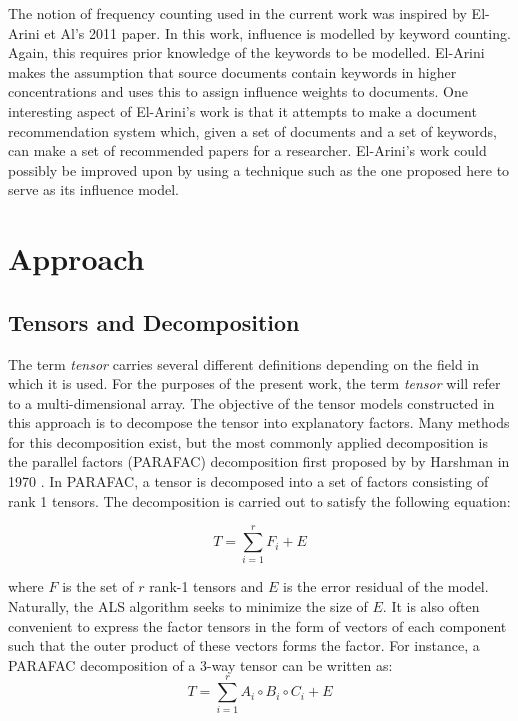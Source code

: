 \documentclass{article}
\begin{document}
The notion of frequency counting used in the current work was inspired
by El-Arini et Al's 2011 paper\cite{el-arini2011}.  In this work,
influence is modelled by keyword counting.  Again, this requires prior
knowledge of the keywords to be modelled.  El-Arini makes the
assumption that source documents contain keywords in higher
concentrations and uses this to assign influence weights to documents.
One interesting aspect of El-Arini's work is that it attempts to make
a document recommendation system which, given a set of documents and
a set of keywords, can make a set of recommended papers for
a researcher.  El-Arini's work could possibly be improved upon by
using a technique such as the one proposed here to serve as its
influence model.

\section{Approach}
\subsection{Tensors and Decomposition}
The term {\em tensor} carries several different definitions depending
on the field in which it is used.  For the purposes of the present
work, the term {\em tensor} will refer to a multi-dimensional array.
The objective of the tensor models constructed in this approach is to
decompose the tensor into explanatory factors.  Many methods for this
decomposition exist, but the most commonly applied decomposition is
the parallel factors (PARAFAC) decomposition first proposed by by
Harshman in 1970 \cite{harshman1970}.  In PARAFAC, a tensor is
decomposed into a set of factors consisting of rank 1 tensors.  The
decomposition is carried out to satisfy the following equation:

\begin{equation}
    \label{eq:parafac}
    T = \displaystyle\sum_{i=1}^{r} F_i + E
\end{equation}

where $F$ is the set of $r$ rank-1 tensors and $E$ is the error
residual of the model.  Naturally, the ALS algorithm seeks to minimize
the size of $E$.  It is also often convenient to express the factor
tensors in the form of vectors of each component such that the outer
product of these vectors forms the factor.  For instance,
a PARAFAC decomposition of a 3-way tensor can be written as:
\begin{equation}
    \label{eq:parafac-comp}
    T = \displaystyle\sum_{i=1}^{r} A_i \circ B_i \circ C_i + E
\end{equation}
\end{document}
